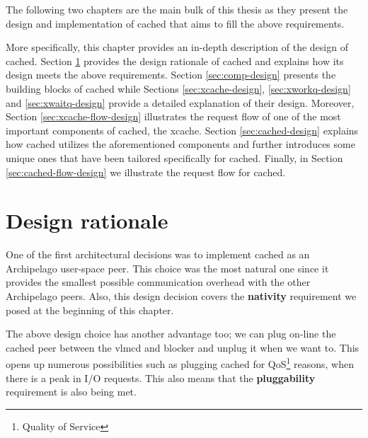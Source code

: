 The following two chapters are the main bulk of this thesis as they present the 
design and implementation of cached that aims to fill the above requirements.

More specifically, this chapter provides an in-depth description of the design 
of cached. Section \ref{sec:rationale-design} provides the design rationale of 
cached and explains how its design meets the above requirements. Section 
\ref{sec:comp-design} presents the building blocks of cached while Sections 
\ref{sec:xcache-design}, \ref{sec:xworkq-design} and \ref{sec:xwaitq-design} 
provide a detailed explanation of their design. Moreover, Section 
\ref{sec:xcache-flow-design} illustrates the request flow of one of the most 
important components of cached, the xcache. Section \ref{sec:cached-design} 
explains how cached utilizes the aforementioned components and further 
introduces some unique ones that have been tailored specifically for cached.  
Finally, in Section \ref{sec:cached-flow-design} we illustrate the request flow 
for cached.

\section{Design rationale}\label{sec:rationale-design}

One of the first architectural decisions was to implement cached as an 
Archipelago user-space peer.  This choice was the most natural one since it 
provides the smallest possible communication overhead with the other 
Archipelago peers. Also, this design decision covers the \textbf{nativity} 
requirement we posed at the beginning of this chapter.

The above design choice has another advantage too; we can plug on-line the 
cached peer between the vlmcd and blocker and unplug it when we want to. This 
opens up numerous possibilities such as plugging cached for 
QoS\footnote{Quality of Service} reasons, when there is a peak in I/O requests.  
This also means that the \textbf{pluggability} requirement is also being met.

\begin{comment}
This is possible because, as we have mentioned in Section \ref{sec:arch-ipc}, 
XSEG ports can be registered on-line. Thus, during normal operation, the 
administrator can add the cached port to the request path between vlmcd and 
blocker, and all requests will seamlessly be intercepted by cached. This 
follows the same principle with bcache, which plugs its own request\_fn() 
function to the virtual device it creates.  Unlike bcache however, cached can 
be plugged on and off at any time.
\end{comment}

